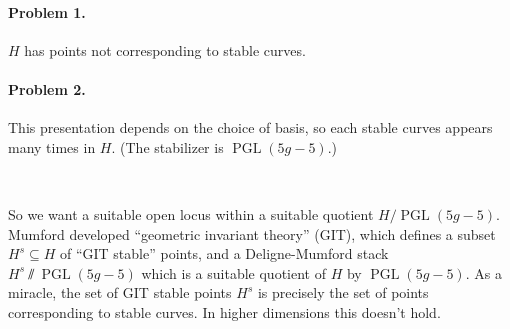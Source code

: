 \documentclass{article}
\theoremstyle{definition}
\DeclareMathOperator{\PGL}{PGL}
\begin{document}
\paragraph{Problem 1.} $H$ has points not corresponding to stable curves.

\paragraph{Problem 2.} This presentation depends on the choice of basis, so each
stable curves appears many times in $H$. (The stabilizer is $\PGL(5g-5)$.)

~

So we want a suitable open locus within a suitable quotient $H/\PGL(5g-5)$.
Mumford developed ``geometric invariant theory'' (GIT), which defines a subset
$H^s\subseteq H$ of ``GIT stable'' points, and a Deligne-Mumford stack
$H^s\sslash\PGL(5g-5)$ which is a suitable quotient of $H$ by $\PGL(5g-5)$. As a
miracle, the set of GIT stable points $H^s$ is precisely the set of points
corresponding to stable curves. In higher dimensions this doesn't hold.
\end{document}
